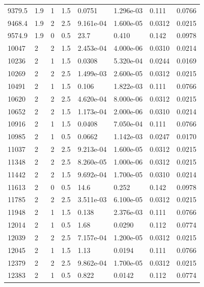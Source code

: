 \documentclass[preview]{standalone}
\begin{document}
{{{\begin{tabular}{L{1.2cm}C{1.2cm} C{0.3cm}C{0.5cm} C{1.4cm}C{1.4cm} C{1.4cm}C{1.4cm}}
  9379.5  &   1.9  & 1     & 1.5 &  0.0751  & 1.296e-03  & 0.111 &  0.0766   \\ 
  9468.4  &   1.9  & 2     & 2.5 &  9.161e-04  & 1.600e-05  & 0.0312 &  0.0215   \\ 
  9574.9  &   1.9  & 0     & 0.5 &  23.7  & 0.410  & 0.142 &  0.0978   \\ 
  10047  &     2  & 2     & 1.5 &  2.453e-04  & 4.000e-06  & 0.0310 &  0.0214   \\ 
  10236  &     2  & 1     & 1.5 &  0.0308  & 5.320e-04  & 0.0244 &  0.0169   \\ 
  10269  &     2  & 2     & 2.5 &  1.499e-03  & 2.600e-05  & 0.0312 &  0.0215   \\ 
  10491  &     2  & 1     & 1.5 &  0.106  & 1.822e-03  & 0.111 &  0.0766   \\ 
  10620  &     2  & 2     & 2.5 &  4.620e-04  & 8.000e-06  & 0.0312 &  0.0215   \\ 
  10652  &     2  & 2     & 1.5 &  1.173e-04  & 2.000e-06  & 0.0310 &  0.0214   \\ 
  10916  &     2  & 1     & 1.5 &  0.0408  & 7.050e-04  & 0.111 &  0.0766   \\ 
  10985  &     2  & 1     & 0.5 &  0.0662  & 1.142e-03  & 0.0247 &  0.0170   \\ 
  11037  &     2  & 2     & 2.5 &  9.213e-04  & 1.600e-05  & 0.0312 &  0.0215   \\ 
  11348  &     2  & 2     & 2.5 &  8.260e-05  & 1.000e-06  & 0.0312 &  0.0215   \\ 
  11442  &     2  & 2     & 1.5 &  9.692e-04  & 1.700e-05  & 0.0310 &  0.0214   \\ 
  11613  &     2  & 0     & 0.5 &  14.6  & 0.252  & 0.142 &  0.0978   \\ 
  11785  &     2  & 2     & 2.5 &  3.511e-03  & 6.100e-05  & 0.0312 &  0.0215   \\ 
  11948  &     2  & 1     & 1.5 &  0.138  & 2.376e-03  & 0.111 &  0.0766   \\ 
  12014  &     2  & 1     & 0.5 &  1.68  & 0.0290  & 0.112 &  0.0774   \\ 
  12039  &     2  & 2     & 2.5 &  7.157e-04  & 1.200e-05  & 0.0312 &  0.0215   \\ 
  12045  &     2  & 1     & 1.5 &  1.13  & 0.0194  & 0.111 &  0.0766   \\ 
  12379  &     2  & 2     & 2.5 &  9.862e-04  & 1.700e-05  & 0.0312 &  0.0215   \\ 
  12383  &     2  & 1     & 0.5 &  0.822  & 0.0142  & 0.112 &  0.0774   \\ 

\end{tabular}}}}
\end{document}
